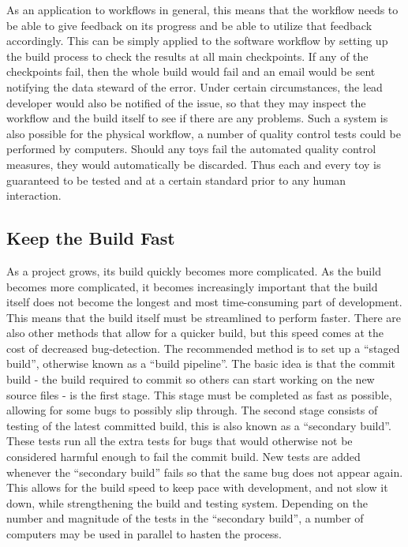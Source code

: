 As an application to workflows in general, this means that the workflow needs to be able to give feedback on its progress and be able to utilize that feedback accordingly. This can be simply applied to the software workflow by setting up the build process to check the results at all main checkpoints.  If any of the checkpoints fail, then the whole build would fail and an email would be sent notifying the data steward of the error. Under certain circumstances, the lead developer would also be notified of the issue, so that they may inspect the workflow and the build itself to see if there are any problems. Such a system is also possible for the physical workflow, a number of quality control tests could be performed by computers. Should any toys fail the automated quality control measures, they would automatically be discarded. Thus each and every toy is guaranteed to be tested and at a certain standard prior to any human interaction.

\subsection{Keep the Build Fast} %
\label{sub:keep_the_build_fast}
As a project grows, its build quickly becomes more complicated. As the build becomes more complicated, it becomes increasingly important that the build itself does not become the longest and most time-consuming part of development. This means that the build itself must be streamlined to perform faster. There are also other methods that allow for a quicker build, but this speed comes at the cost of decreased bug-detection. The recommended method is to set up a ``staged build'', otherwise known as a ``build pipeline''.  The basic idea is that the commit build - the build required to commit so others can start working on the new source files - is the first stage. This stage must be completed as fast as possible, allowing for some bugs to possibly slip through.  The second stage consists of testing of the latest committed build, this is also known as a ``secondary build''.  These tests run all the extra tests for bugs that would otherwise not be considered harmful enough to fail the commit build.  New tests are added whenever the ``secondary build'' fails so that the same bug does not appear again. This allows for the build speed to keep pace with development, and not slow it down, while strengthening the build and testing system. Depending on the number and magnitude of the tests in the ``secondary build'', a number of computers may be used in parallel to hasten the process.\newline

